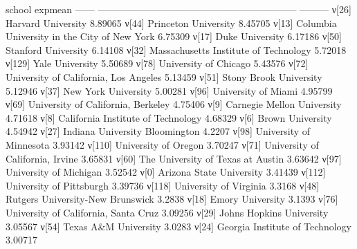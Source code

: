         school                                                            expmean
------  --------------------------------------------------------------  ---------
ν[26]   Harvard University                                               8.89065
ν[44]   Princeton University                                             8.45705
ν[13]   Columbia University in the City of New York                      6.75309
ν[17]   Duke University                                                  6.17186
ν[50]   Stanford University                                              6.14108
ν[32]   Massachusetts Institute of Technology                            5.72018
ν[129]  Yale University                                                  5.50689
ν[78]   University of Chicago                                            5.43576
ν[72]   University of California, Los Angeles                            5.13459
ν[51]   Stony Brook University                                           5.12946
ν[37]   New York University                                              5.00281
ν[96]   University of Miami                                              4.95799
ν[69]   University of California, Berkeley                               4.75406
ν[9]    Carnegie Mellon University                                       4.71618
ν[8]    California Institute of Technology                               4.68329
ν[6]    Brown University                                                 4.54942
ν[27]   Indiana University Bloomington                                   4.2207
ν[98]   University of Minnesota                                          3.93142
ν[110]  University of Oregon                                             3.70247
ν[71]   University of California, Irvine                                 3.65831
ν[60]   The University of Texas at Austin                                3.63642
ν[97]   University of Michigan                                           3.52542
ν[0]    Arizona State University                                         3.41439
ν[112]  University of Pittsburgh                                         3.39736
ν[118]  University of Virginia                                           3.3168
ν[48]   Rutgers University-New Brunswick                                 3.2838
ν[18]   Emory University                                                 3.1393
ν[76]   University of California, Santa Cruz                             3.09256
ν[29]   Johns Hopkins University                                         3.05567
ν[54]   Texas A&M University                                             3.0283
ν[24]   Georgia Institute of Technology                                  3.00717

